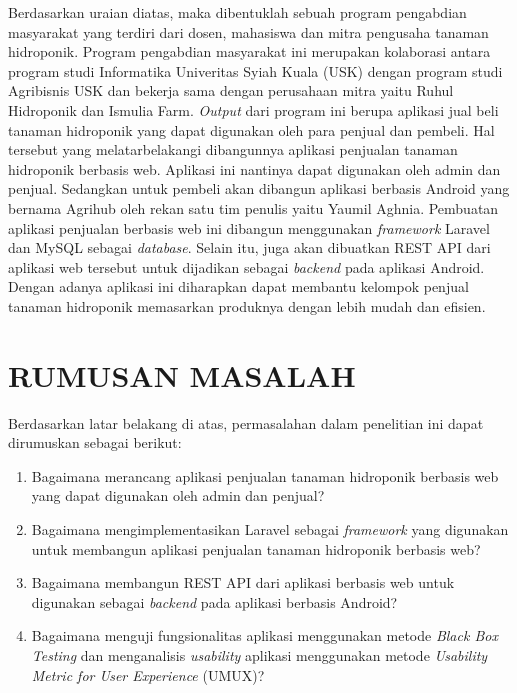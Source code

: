 \par Berdasarkan uraian diatas, maka dibentuklah sebuah program pengabdian masyarakat yang terdiri dari dosen, mahasiswa dan mitra pengusaha tanaman hidroponik. Program pengabdian masyarakat ini merupakan kolaborasi antara program studi Informatika Univeritas Syiah Kuala (USK) dengan program studi Agribisnis USK dan bekerja sama dengan perusahaan mitra yaitu Ruhul Hidroponik dan Ismulia Farm. \textit{Output} dari program ini berupa aplikasi jual beli tanaman hidroponik yang dapat digunakan oleh para penjual dan pembeli. Hal tersebut yang melatarbelakangi dibangunnya aplikasi penjualan tanaman hidroponik berbasis web. Aplikasi ini nantinya dapat digunakan oleh admin dan penjual. Sedangkan untuk pembeli akan dibangun aplikasi berbasis Android yang bernama Agrihub oleh rekan satu tim penulis yaitu Yaumil Aghnia. Pembuatan aplikasi penjualan berbasis web ini dibangun menggunakan \textit{framework} Laravel dan MySQL sebagai \textit{database}. Selain itu, juga akan dibuatkan REST API dari aplikasi web tersebut untuk dijadikan sebagai \textit{backend} pada aplikasi Android. Dengan adanya aplikasi ini diharapkan dapat membantu kelompok penjual tanaman hidroponik memasarkan produknya dengan lebih mudah dan efisien.

\fancyhf{} 
\fancyfoot[R]{\thepage}

\section{\uppercase{RUMUSAN MASALAH}}
Berdasarkan latar belakang di atas, permasalahan dalam penelitian ini dapat dirumuskan sebagai berikut:
\begin{enumerate}
	\item Bagaimana merancang aplikasi penjualan tanaman hidroponik berbasis web yang dapat digunakan oleh admin dan penjual?
	\item Bagaimana mengimplementasikan Laravel sebagai \textit{framework} yang digunakan untuk membangun aplikasi penjualan tanaman hidroponik berbasis web?
	\item Bagaimana membangun REST API dari aplikasi berbasis web untuk digunakan sebagai \textit{backend}  pada aplikasi berbasis Android?
	\item Bagaimana menguji fungsionalitas aplikasi menggunakan metode \textit{Black Box Testing} dan menganalisis \textit{usability} aplikasi menggunakan metode \textit{Usability Metric for User Experience} (UMUX)?
\end{enumerate}

